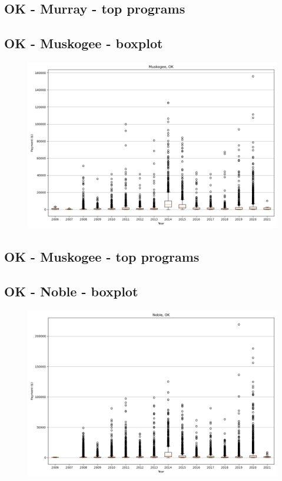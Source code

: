 \subsection*{OK - Murray - top programs}

\newpage
\subsection*{OK - Muskogee - boxplot}
\begin{figure}[h]
\centering
\includegraphics[width=7in]{../output/boxplots/counties/Muskogee-OK_boxplot.png}
\end{figure}


\subsection*{OK - Muskogee - top programs}

\newpage
\subsection*{OK - Noble - boxplot}
\begin{figure}[h]
\centering
\includegraphics[width=7in]{../output/boxplots/counties/Noble-OK_boxplot.png}
\end{figure}


